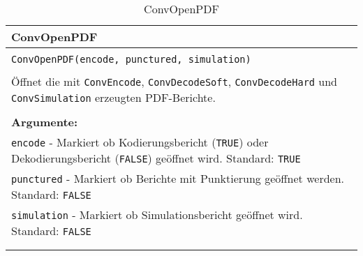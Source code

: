 \begin{longtable}{|p{\textwidth}|}
\hline
\rowcolor{lightblue}
ConvOpenPDF
\\
\hline
\\
\texttt{ConvOpenPDF(encode, punctured, simulation)}\\
\\
Öffnet die mit \texttt{ConvEncode}, \texttt{ConvDecodeSoft}, \texttt{ConvDecodeHard} und \texttt{ConvSimulation} erzeugten PDF-Berichte.\\
\\
\textbf{Argumente:}\\
\texttt{encode} - Markiert ob Kodierungsbericht (\texttt{TRUE}) oder Dekodierungsbericht (\texttt{FALSE}) geöffnet wird. Standard: \texttt{TRUE}\\
\texttt{punctured} - Markiert ob Berichte mit Punktierung geöffnet werden. Standard: \texttt{FALSE}\\
\texttt{simulation} - Markiert ob Simulationsbericht geöffnet wird. Standard: \texttt{FALSE}\\
\\
\hline
\caption{ConvOpenPDF}
\label{funktion:ConvOpenPDF}
\end{longtable}